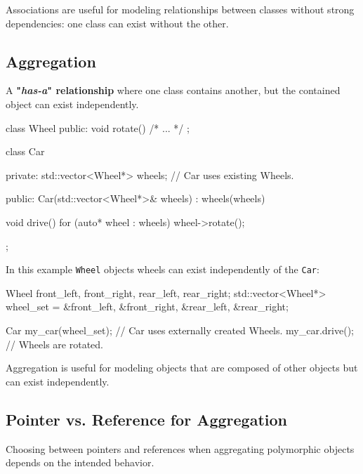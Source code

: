\vspace{-0.5em}

Associations are useful for modeling relationships between classes without strong dependencies: one class can exist without the other.

\vspace{-0.5em}

\subsection{Aggregation}

A \textbf{"\textit{has-a}" relationship} where one class contains another, but the contained object can exist independently.

\begin{codeblock}[language=C++, numbers=none]
class Wheel {
public:
    void rotate() { /* ... */ }
};

class Car {
private:
    std::vector<Wheel*> wheels; // Car uses existing Wheels.

public:
    Car(std::vector<Wheel*>& wheels) : wheels(wheels) {}

    void drive() {
        for (auto* wheel : wheels) {
            wheel->rotate();
        }
    }
};
\end{codeblock}

In this example \texttt{Wheel} objects wheels can exist independently of the \texttt{Car}:

\begin{codeblock}[language=C++]
    Wheel front_left, front_right, rear_left, rear_right;
    std::vector<Wheel*> wheel_set = {&front_left, &front_right, &rear_left, &rear_right};
    
    Car my_car(wheel_set); // Car uses externally created Wheels.
    my_car.drive(); // Wheels are rotated.
\end{codeblock}

Aggregation is useful for modeling objects that are composed of other objects but can exist independently.

\subsection{Pointer vs. Reference for Aggregation}

Choosing between pointers and references when aggregating polymorphic objects depends on the intended behavior.

\vspace{0.75em}

